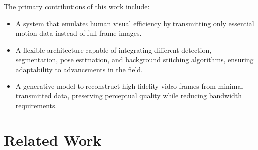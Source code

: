 \documentclass[sigconf, screen, review, anonymous]{acmart}
\begin{document}
The primary contributions of this work include:
\begin{itemize}
    \item A system that emulates human visual efficiency by transmitting only essential motion data instead of full-frame images.
    \item A flexible architecture capable of integrating different detection, segmentation, pose estimation, and background stitching algorithms, ensuring adaptability to advancements in the field.
    \item A generative model to reconstruct high-fidelity video frames from minimal transmitted data, preserving perceptual quality while reducing bandwidth requirements.
\end{itemize}

\newpage

\section{Related Work}
\end{document}
